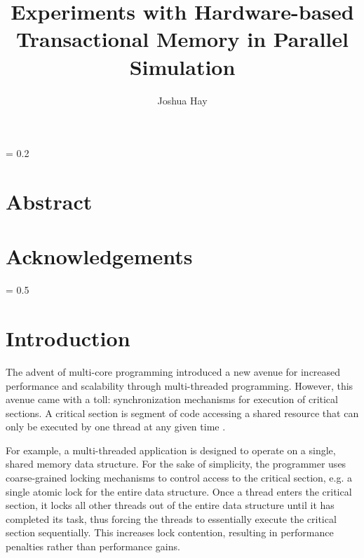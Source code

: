 \documentclass[a4paper]{article}
\title{
    \vspace{2in}
    \textbf{Experiments with Hardware-based Transactional Memory in Parallel
    Simulation \\}
    \vspace{2in}
}
\author{Joshua Hay}
\affil{hayja@mail.uc.edu}
\affil{(513) 607-4929}
\begin{document}
%
\maketitle
\thispagestyle{empty}
\newpage
\thispagestyle{empty}
\parskip = 0.2\baselineskip
\newpage
\thispagestyle{empty}
\section*{\textbf{Abstract}}
\newpage
\thispagestyle{empty}
\section*{\textbf{Acknowledgements}}
\newpage
\thispagestyle{empty}
\tableofcontents
\newpage
\thispagestyle{empty}
\listoffigures
\listoftables
\parskip = 0.5\baselineskip
\newpage

\section{\textbf{Introduction}}

\indent The advent of multi-core programming introduced a new avenue for increased
performance and scalability through multi-threaded programming.  However, this
avenue came with a toll: synchronization mechanisms for execution of critical
sections.  A critical section is segment of code accessing a shared resource
that can only be executed by one thread at any given time \cite{os_concepts}.
\par

\indent For example, a multi-threaded application is designed to operate on a
single, shared memory data structure.  For the sake of simplicity, the
programmer uses coarse-grained locking mechanisms to control access to the
critical section, e.g. a single atomic lock for the entire data structure.  Once
a thread enters the critical section, it locks all other threads out of the
entire data structure until it has completed its task, thus forcing the threads
to essentially execute the critical section sequentially. This increases lock
contention, resulting in performance penalties rather than performance gains.
\par

\end{document}
